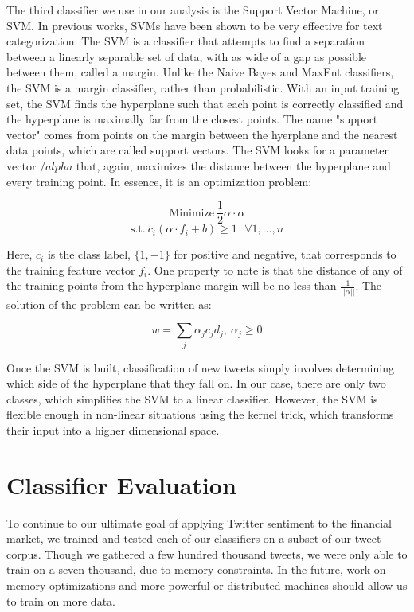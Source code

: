 \documentclass[preprint,pre,floats,aps,amsmath,amssymb,12pt]{revtex4}
\begin{document}
The third classifier we use in our analysis is the Support Vector Machine, or SVM. In previous works, SVMs have been shown to be very effective for text categorization. The SVM is a classifier that attempts to find a separation between a linearly separable set of data, with as wide of a gap as possible between them, called a margin. Unlike the Naive Bayes and MaxEnt classifiers, the SVM is a margin classifier, rather than probabilistic. With an input training set, the SVM finds the hyperplane such that each point is correctly classified and the hyperplane is maximally far from the closest points. The name "support vector" comes from points on the margin between the hyerplane and the nearest data points, which are called support vectors. 
The SVM looks for a parameter vector $/alpha$ that, again, maximizes the distance between the hyperplane and every training point. In essence, it is an optimization problem:

\[ \text{Minimize} \ \frac{1}{2} \alpha \cdot \alpha \]
\[\text{s.t.} \ c_{i}(\alpha\cdot f_{i} + b) \geq 1 \ \ \  \forall1,\ldots, n \]

Here, $c_{i}$ is the class label, $\{1, -1\}$ for positive and negative, that corresponds to the training feature vector $f_{i}$. One property to note is that the distance of any of the training points from the hyperplane margin will be no less than $\frac{1}{||\alpha||}$.
The solution of the problem can be written as:

\[ w = \displaystyle\sum\limits_{j} \alpha_{j} c_{j} d_{j}, \ \alpha_{j} \geq 0 \]

Once the SVM is built, classification of new tweets simply involves determining which side of the hyperplane that they fall on. 
In our case, there are only two classes, which simplifies the SVM to a linear classifier. However, the SVM is flexible enough in non-linear situations using the kernel trick, which transforms their input into a higher dimensional space.

\section{Classifier Evaluation}
\label{sec:eval}

To continue to our ultimate goal of applying Twitter sentiment to the financial market, we trained and tested each of our classifiers on a subset of our tweet corpus. Though we gathered a few hundred thousand tweets, we were only able to train on a seven thousand, due to memory constraints. In the future, work on memory optimizations and more powerful or distributed machines should allow us to train on more data. 
\end{document}
